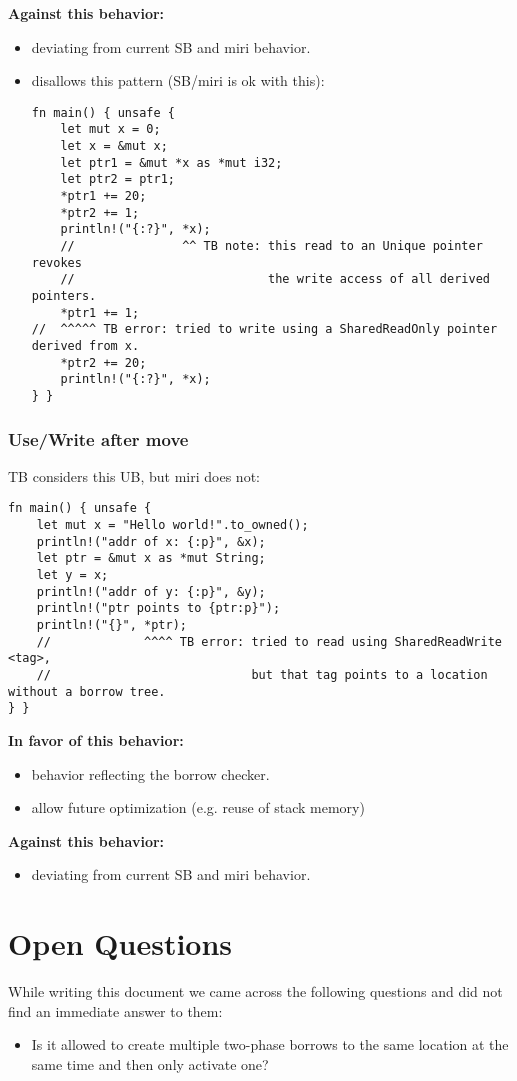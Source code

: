 \documentclass[]{article}
\begin{document}
\textbf{Against this behavior:}
\begin{itemize}
    \item deviating from current SB and miri behavior.
    \item disallows this pattern (SB/miri is ok with this):
{\small
\begin{verbatim}
fn main() { unsafe {
    let mut x = 0;  
    let x = &mut x;
    let ptr1 = &mut *x as *mut i32;
    let ptr2 = ptr1;
    *ptr1 += 20;
    *ptr2 += 1;
    println!("{:?}", *x);
    //               ^^ TB note: this read to an Unique pointer revokes
    //                           the write access of all derived pointers.
    *ptr1 += 1;
//  ^^^^^ TB error: tried to write using a SharedReadOnly pointer derived from x.
    *ptr2 += 20;
    println!("{:?}", *x);
} }
\end{verbatim}
}
\end{itemize}

\subsubsection{Use/Write after move}
TB considers this UB, but miri does not:
{\small
\begin{verbatim}
fn main() { unsafe {
    let mut x = "Hello world!".to_owned();
    println!("addr of x: {:p}", &x);
    let ptr = &mut x as *mut String;
    let y = x;
    println!("addr of y: {:p}", &y);
    println!("ptr points to {ptr:p}");
    println!("{}", *ptr);
    //             ^^^^ TB error: tried to read using SharedReadWrite <tag>,
    //                            but that tag points to a location without a borrow tree.
} }
\end{verbatim}
}


\textbf{In favor of this behavior:}
\begin{itemize}
    \item behavior reflecting the borrow checker.
    \item allow future optimization (e.g. reuse of stack memory)
\end{itemize}

\textbf{Against this behavior:}
\begin{itemize}
    \item deviating from current SB and miri behavior.
\end{itemize}

\newpage

\section{Open Questions}
While writing this document we came across the following questions and did not find an immediate answer to them:
\begin{itemize}
    \item Is it allowed to create multiple two-phase borrows to the same location at the same time and then only activate one?
\end{itemize}



\end{document}
